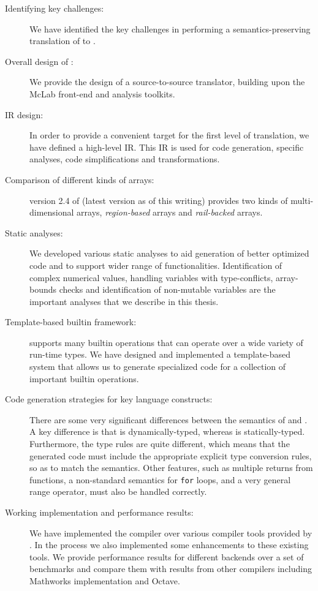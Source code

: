 \begin{description}

\item[Identifying key challenges:] We have identified the key challenges
in performing a semantics-preserving translation of \matlab to \xten.

\item[Overall design of \mixten:] We provide the design of a 
source-to-source translator, building upon the McLab front-end and
analysis toolkits.

\item[\mixten IR design:] In order to provide a convenient
target for the first level of translation, we have defined a high-level
\mixten IR.  This IR is used for code generation, \xten specific analyses, 
code simplifications and transformations.

\item[Comparison of different kinds of \xten arrays:] version 2.4 of \xten 
(latest version as of this writing) provides two kinds of multi-dimensional 
arrays, \emph{region-based} arrays and \emph{rail-backed} arrays.  

\item[Static analyses:] We developed various static analyses to aid generation
of better optimized code and to support wider range of \matlab functionalities.
Identification of complex numerical values, handling variables with	
type-conflicts, array-bounds checks and identification of non-mutable variables
are the important analyses that we describe in this thesis.

\item[Template-based builtin framework:] \matlab supports many builtin
operations that can operate over a wide variety of run-time types.  We
have designed and implemented a template-based system that allows us to
generate specialized \xten code for a collection of important builtin
operations.

\item[Code generation strategies for key language constructs:]  There
are some very significant differences between the semantics of \matlab
and \xten.  A key difference is that \matlab is dynamically-typed,
whereas \xten is statically-typed.   Furthermore, the type rules are
quite different, which means that the generated \xten code must include
the appropriate explicit type conversion rules, so as to match the
\matlab semantics.   Other \matlab features, such as multiple returns
from functions, a non-standard semantics for \texttt{for} loops, and a
very general range operator, must also be handled correctly.

\item[Working implementation and performance results:] We have implemented the 
\mixten compiler over various \matlab compiler tools provided by \mclab. In the
process we also implemented some enhancements to these existing tools.
We provide performance results for different \xten backends over a set 
of benchmarks and compare them with results from other \matlab compilers
including Mathworks \matlab implementation and Octave.

\end{description}

